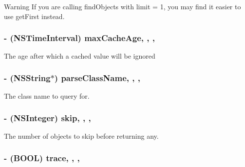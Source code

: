 \begin{DoxyWarning}{Warning}
If you are calling {\ttfamily find\+Objects} with {\ttfamily limit = 1}, you may find it easier to use {\ttfamily get\+First} instead. 
\end{DoxyWarning}
\hypertarget{class_p_f_query_a89e6f1c2e8ce45422b7a08fac4c36f24}{}
\subsubsection[{max\+Cache\+Age}]{\setlength{\rightskip}{0pt plus 5cm}-\/ (N\+S\+Time\+Interval) max\+Cache\+Age\hspace{0.3cm}{\ttfamily [read]}, {\ttfamily [write]}, {\ttfamily [nonatomic]}, {\ttfamily [assign]}}\label{class_p_f_query_a89e6f1c2e8ce45422b7a08fac4c36f24}
The age after which a cached value will be ignored \hypertarget{class_p_f_query_afba0f4baaf28a4b871fe5b9d5dc3604c}{}
\subsubsection[{parse\+Class\+Name}]{\setlength{\rightskip}{0pt plus 5cm}-\/ (N\+S\+String$\ast$) parse\+Class\+Name\hspace{0.3cm}{\ttfamily [read]}, {\ttfamily [write]}, {\ttfamily [nonatomic]}, {\ttfamily [strong]}}\label{class_p_f_query_afba0f4baaf28a4b871fe5b9d5dc3604c}
The class name to query for. \hypertarget{class_p_f_query_a2b5deec7ffc434a4c787f5aa0471ddcd}{}
\subsubsection[{skip}]{\setlength{\rightskip}{0pt plus 5cm}-\/ (N\+S\+Integer) skip\hspace{0.3cm}{\ttfamily [read]}, {\ttfamily [write]}, {\ttfamily [nonatomic]}, {\ttfamily [assign]}}\label{class_p_f_query_a2b5deec7ffc434a4c787f5aa0471ddcd}
The number of objects to skip before returning any. \hypertarget{class_p_f_query_a86849de3551a7ea56c652f55f48bfe47}{}
\subsubsection[{trace}]{\setlength{\rightskip}{0pt plus 5cm}-\/ (B\+O\+O\+L) trace\hspace{0.3cm}{\ttfamily [read]}, {\ttfamily [write]}, {\ttfamily [nonatomic]}, {\ttfamily [assign]}}\label{class_p_f_query_a86849de3551a7ea56c652f55f48bfe47}




